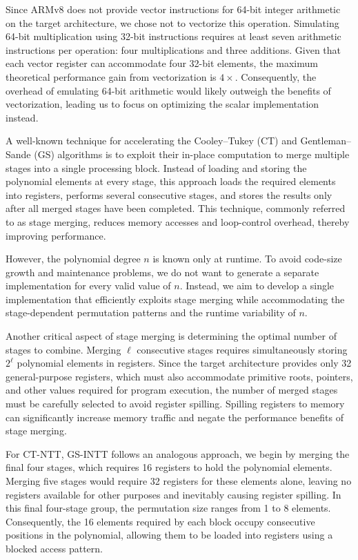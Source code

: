 Since ARMv8 does not provide vector instructions for 64-bit integer arithmetic on the target architecture, we chose not to vectorize this operation. Simulating 64-bit multiplication using 32-bit instructions requires at least seven arithmetic instructions per operation: four multiplications and three additions. Given that each vector register can accommodate four 32-bit elements, the maximum theoretical performance gain from vectorization is \(4\times\). Consequently, the overhead of emulating 64-bit arithmetic would likely outweigh the benefits of vectorization, leading us to focus on optimizing the scalar implementation instead.

A well-known technique for accelerating the Cooley–Tukey (CT) and Gentleman–Sande (GS) algorithms is to exploit their in-place computation to merge multiple stages into a single processing block. Instead of loading and storing the polynomial elements at every stage, this approach loads the required elements into registers, performs several consecutive stages, and stores the results only after all merged stages have been completed. This technique, commonly referred to as stage merging, reduces memory accesses and loop-control overhead, thereby improving performance.

However, the polynomial degree \(n\) is known only at runtime. To avoid code-size growth and maintenance problems, we do not want to generate a separate implementation for every valid value of \(n\). Instead, we aim to develop a single implementation that efficiently exploits stage merging while accommodating the stage-dependent permutation patterns and the runtime variability of \(n\).

Another critical aspect of stage merging is determining the optimal number of stages to combine. Merging \(\ell\) consecutive stages requires simultaneously storing \(2^\ell\) polynomial elements in registers. Since the target architecture provides only 32 general-purpose registers, which must also accommodate primitive roots, pointers, and other values required for program execution, the number of merged stages must be carefully selected to avoid register spilling. Spilling registers to memory can significantly increase memory traffic and negate the performance benefits of stage merging.

For CT-NTT, GS-INTT follows an analogous approach, we begin by merging the final four stages, which requires 16 registers to hold the polynomial elements. Merging five stages would require 32 registers for these elements alone, leaving no registers available for other purposes and inevitably causing register spilling. In this final four-stage group, the permutation size ranges from 1 to 8 elements. Consequently, the 16 elements required by each block occupy consecutive positions in the polynomial, allowing them to be loaded into registers using a blocked access pattern.

